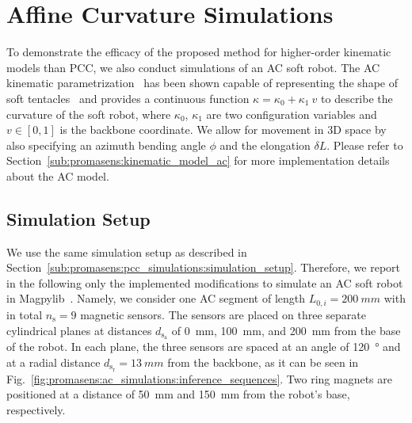 \section{Affine Curvature Simulations}\label{sec:promasens:ac_simulations}
To demonstrate the efficacy of the proposed method for higher-order kinematic models than \gls{PCC}, we also conduct simulations of an \gls{AC} soft robot.
The \gls{AC} kinematic parametrization~\citep{della2020soft} has been shown capable of representing the shape of soft tentacles~\citep{stella2022experimental, stella2023piecewise} and provides a continuous function $\kappa = \kappa_0 + \kappa_1 \: v$ to describe the curvature of the soft robot, where $\kappa_0$, $\kappa_1$ are two configuration variables and $v \in [0, 1]$ is the backbone coordinate. We allow for movement in 3D space by also specifying an azimuth bending angle $\phi$ and the elongation $\delta L$.
Please refer to Section~\ref{sub:promasens:kinematic_model_ac} for more implementation details about the \gls{AC} model.


\subsection{Simulation Setup}\label{sub:promasens:ac_simulations:simulation_setup}
We use the same simulation setup as described in Section~\ref{sub:promasens:pcc_simulations:simulation_setup}. 
Therefore, we report in the following only the implemented modifications to simulate an \gls{AC} soft robot in Magpylib~\citep{magpylib2020}.
Namely, we consider one \gls{AC} segment of length $L_{0,i} = \SI{200}{mm}$ with in total $n_\mathrm{s} = 9$ magnetic sensors. 
The sensors are placed on three separate cylindrical planes at distances $d_{\mathrm{s}_\mathrm{a}}$ of \SI{0}{mm}, \SI{100}{mm}, and \SI{200}{mm} from the base of the robot. In each plane, the three sensors are spaced at an angle of \SI{120}{\degree} and at a radial distance $d_{\mathrm{s}_\mathrm{r}} = \SI{13}{mm}$ from the backbone, as it can be seen in Fig.~\ref{fig:promasens:ac_simulations:inference_sequences}.
Two ring magnets are positioned at a distance of \SI{50}{mm} and \SI{150}{mm} from the robot's base, respectively.


